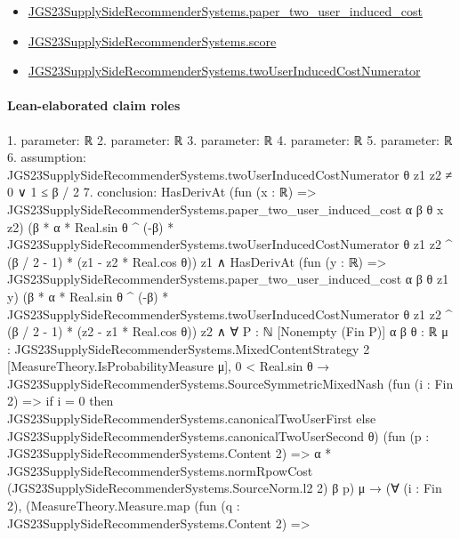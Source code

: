 \documentclass[10pt]{article}
\begin{document}
\begin{itemize}
\item \hyperlink{governing-declaration-04204b422df9012d}{JGS23\allowbreak{}Supply\allowbreak{}Side\allowbreak{}Recommender\allowbreak{}Systems.\allowbreak{}paper\_\allowbreak{}two\_\allowbreak{}user\_\allowbreak{}induced\_\allowbreak{}cost}
\item \hyperlink{governing-declaration-e3725af4eb21c4db}{JGS23\allowbreak{}Supply\allowbreak{}Side\allowbreak{}Recommender\allowbreak{}Systems.\allowbreak{}score}
\item \hyperlink{governing-declaration-1bddfdc6005d3a0f}{JGS23\allowbreak{}Supply\allowbreak{}Side\allowbreak{}Recommender\allowbreak{}Systems.\allowbreak{}two\allowbreak{}User\allowbreak{}Induced\allowbreak{}Cost\allowbreak{}Numerator}
\end{itemize}
\paragraph{Lean-elaborated claim roles}\begin{ReviewVerbatim}
1. parameter: ℝ
2. parameter: ℝ
3. parameter: ℝ
4. parameter: ℝ
5. parameter: ℝ
6. assumption: JGS23SupplySideRecommenderSystems.twoUserInducedCostNumerator θ z1 z2 ≠ 0 ∨ 1 ≤ β / 2
7. conclusion: HasDerivAt (fun (x : ℝ) => JGS23SupplySideRecommenderSystems.paper_two_user_induced_cost α β θ x z2)
    (β * α * Real.sin θ ^ (-β) * JGS23SupplySideRecommenderSystems.twoUserInducedCostNumerator θ z1 z2 ^ (β / 2 - 1) *
      (z1 - z2 * Real.cos θ))
    z1 ∧
  HasDerivAt (fun (y : ℝ) => JGS23SupplySideRecommenderSystems.paper_two_user_induced_cost α β θ z1 y)
      (β * α * Real.sin θ ^ (-β) * JGS23SupplySideRecommenderSystems.twoUserInducedCostNumerator θ z1 z2 ^ (β / 2 - 1) *
        (z2 - z1 * Real.cos θ))
      z2 ∧
    ∀ {P : ℕ} [Nonempty (Fin P)] {α β θ : ℝ} {μ : JGS23SupplySideRecommenderSystems.MixedContentStrategy 2}
      [MeasureTheory.IsProbabilityMeasure μ],
      0 < Real.sin θ →
        JGS23SupplySideRecommenderSystems.SourceSymmetricMixedNash
            (fun (i : Fin 2) =>
              if i = 0 then JGS23SupplySideRecommenderSystems.canonicalTwoUserFirst
              else JGS23SupplySideRecommenderSystems.canonicalTwoUserSecond θ)
            (fun (p : JGS23SupplySideRecommenderSystems.Content 2) =>
              α *
                JGS23SupplySideRecommenderSystems.normRpowCost (JGS23SupplySideRecommenderSystems.SourceNorm.l2 2) β p)
            μ →
          (∀ (i : Fin 2),
              (MeasureTheory.Measure.map
                    (fun (q : JGS23SupplySideRecommenderSystems.Content 2) =>

\end{ReviewVerbatim}
\end{document}
